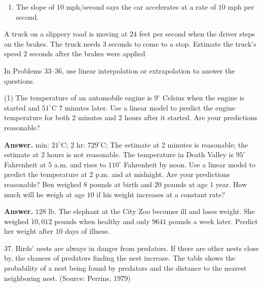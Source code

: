 \documentclass[10pt,]{book}
\theoremstyle{plain}
\theoremstyle{definition}
\theoremstyle{definition}
\theoremstyle{definition}
\theoremstyle{definition}
\numberwithin{equation}{part}
\newcommand\degree[0]{^{\circ}}
\begin{document}
\begin{exerciselist}
\begin{exercisegroup}
\begin{enumerate}[label=*\alph**]
\item\hypertarget{li-1481}{}The slope of \(10\) mph/second says the car accelerates at a rate of \(10\) mph per second.%
\end{enumerate}
%
\exercise[32.]\hypertarget{exercise-388}{}A truck on a slippery road is moving at \(24\) feet per second when the driver steps on the brakes. The truck needs \(3\) seconds to come to a stop. Estimate the truck's speed \(2\) seconds after the brakes were applied%
\end{exercisegroup}
\par\smallskip\noindent
\hypertarget{exercisegroup-50}{}\par\noindent In Problems 33–36, use linear interpolation or extrapolation to answer the questions.%
\begin{exercisegroup}(1)
\exercise[33.]\hypertarget{exercise-389}{}The temperature of an automobile engine is \(9\degree\) Celsius when the engine is started and \(51\degree\)C \(7\) minutes later. Use a linear model to predict the engine temperature for both \(2\) minutes and \(2\) hours after it started. Are your predictions reasonable?%
\par\smallskip
\noindent\textbf{Answer.}\hypertarget{answer-218}{} min: \(21\degree\)C; 2 hr: \(729\degree\)C; The estimate at 2 minutes is reasonable; the estimate at 2 hours is not reasonable.%
\exercise[34.]\hypertarget{exercise-390}{}The temperature in Death Valley is \(95\degree\) Fahrenheit at 5 a.m. and rises to \(110\degree\) Fahrenheit by noon. Use a linear model to predict the temperature at 2 p.m. and at midnight. Are your predictions reasonable?%
\exercise[35.]\hypertarget{exercise-391}{}Ben weighed \(8\) pounds at birth and \(20\) pounds at age \(1\) year. How much will he weigh at age \(10\) if his weight increases at a constant rate?%
\par\smallskip
\noindent\textbf{Answer.}\hypertarget{answer-219}{}\quad
\(128\) lb.%
\exercise[36.]\hypertarget{exercise-392}{}The elephant at the City Zoo becomes ill and loses weight. She weighed \(10,012\) pounds when healthy and only \(9641\) pounds a week later. Predict her weight after \(10\) days of illness.%
\end{exercisegroup}
\par\smallskip\noindent
\item[37.]\hypertarget{exercise-393}{}Birds' nests are always in danger from predators. If there are other nests close by, the chances of predators finding the nest increase. The table shows the probability of a nest being found by predators and the distance to the nearest neighboring nest. (Source: Perrins, 1979) \leavevmode%

\end{exerciselist}
\end{document}
